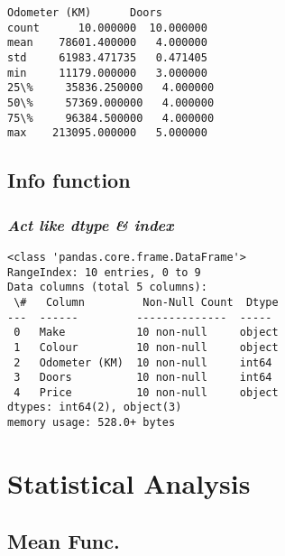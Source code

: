 \documentclass[11pt]{article}
\begin{document}
            \begin{tcolorbox}[breakable, size=fbox, boxrule=.5pt, pad at break*=1mm, opacityfill=0]
\begin{Verbatim}[commandchars=\\\{\}]
       Odometer (KM)      Doors
count      10.000000  10.000000
mean    78601.400000   4.000000
std     61983.471735   0.471405
min     11179.000000   3.000000
25\%     35836.250000   4.000000
50\%     57369.000000   4.000000
75\%     96384.500000   4.000000
max    213095.000000   5.000000
\end{Verbatim}
\end{tcolorbox}
        
    \hypertarget{info-function}{%
\subsection{\texorpdfstring{\textbf{Info
function}}{Info function}}\label{info-function}}

\hypertarget{act-like-dtype-index}{%
\subsubsection{\texorpdfstring{\textbf{\emph{Act like dtype \&
index}}}{Act like dtype \& index}}\label{act-like-dtype-index}}

    \begin{Verbatim}[commandchars=\\\{\}]
<class 'pandas.core.frame.DataFrame'>
RangeIndex: 10 entries, 0 to 9
Data columns (total 5 columns):
 \#   Column         Non-Null Count  Dtype
---  ------         --------------  -----
 0   Make           10 non-null     object
 1   Colour         10 non-null     object
 2   Odometer (KM)  10 non-null     int64
 3   Doors          10 non-null     int64
 4   Price          10 non-null     object
dtypes: int64(2), object(3)
memory usage: 528.0+ bytes
    \end{Verbatim}

    \hypertarget{statistical-analysis}{%
\section{\texorpdfstring{\textbf{Statistical
Analysis}}{Statistical Analysis}}\label{statistical-analysis}}

    \hypertarget{mean-func.}{%
\subsection{\texorpdfstring{\textbf{Mean
Func.}}{Mean Func.}}\label{mean-func.}}
\end{document}
